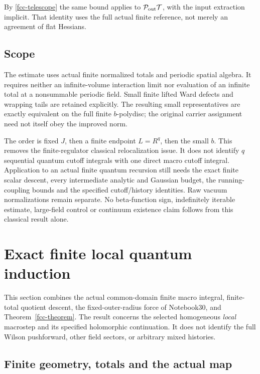 \documentclass[11pt]{article}
\theoremstyle{remark}
\begin{document}
By \eqref{fcc-telescope} the same bound applies to
\(\mathcal P_{\rm out}\mathcal T\), with the input
extraction implicit. That identity uses the full
actual finite reference, not merely an agreement
of flat Hessians.

\subsection{Scope}
\label{fcc-scope}

The estimate uses actual finite normalized totals
and periodic spatial algebra. It requires neither
an infinite-volume interaction limit nor evaluation
of an infinite total at a nonsummable periodic
field. Small finite lifted Ward defects and
wrapping tails are retained explicitly. The
resulting small representatives are exactly
equivalent on the full finite \(b\)-polydisc; the
original carrier assignment need not itself
obey the improved norm.

The order is fixed \(J\), then a finite endpoint
\(L=R^q\), then the small \(b\). This removes the
finite-regulator classical relocalization issue.
It does not identify \(q\) sequential quantum
cutoff integrals with one direct macro cutoff
integral. Application to an actual finite quantum
recursion still needs the exact finite scalar
descent, every intermediate analytic and Gaussian
budget, the running-coupling bounds and the
specified cutoff/history identities. Raw vacuum
normalizations remain separate. No beta-function
sign, indefinitely iterable estimate, large-field
control or continuum existence claim follows
from this classical result alone.


\section{Exact finite local quantum induction}
\label{fqi-section}

This section combines the actual common-domain finite macro integral,
finite-total quotient descent, the fixed-outer-radius force of
Notebook30, and Theorem~\ref{fcc-theorem}. The result concerns the
selected homogeneous \emph{local} macrostep and its specified
holomorphic continuation. It does not identify the full Wilson
pushforward, other field sectors, or arbitrary mixed histories.

\subsection{Finite geometry, totals and the actual map}
\label{fqi-setup-section}
\end{document}
